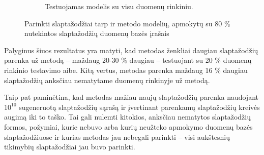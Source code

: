 \documentclass{VUMIFInfBakalaurinis}
\begin{document}
\begin{figure}[H]
\begin{subfigure}{.5\textwidth}
    \caption{Testuojamas modelis su visu  duomenų rinkiniu.}
    \label{plot:passgan-pcfg-linkedin-comparison}
  \end{subfigure}
  \caption{
    Parinkti slaptažodžiai tarp  ir  metodo 
    modelių, apmokytų su 80 \%  nutekintos slaptažodžių 
    duomenų bazės įrašais
  }
  \label{plot:passgan-pcfg-comparison}
\end{figure}%
Palyginus šiuos rezultatus yra matyti, kad  metodas ženkliai 
daugiau slaptažodžių parenka už  metodą -- maždaug 20-30 \% 
daugiau -- testuojant su 20 \%  duomenų rinkinio testavimo 
aibe. Kitą vertus,  metodas parenka maždaug 16 \% daugiau 
slaptažodžių anksčiau nematytame  duomenų rinkinyje už 
 metodą.

Taip pat paminėtina, kad  metodas mažiau naujų slaptažodžių 
parenka naudojant $10^{10}$ sugeneruotą slaptažodžių sąrašą ir įvertinant 
parenkamų slaptažodžių kreivės augimą iki to taško. Tai gali nulemti kitokios, 
anksčiau nematytos slaptažodžių formos, požymiai, kurie nebuvo arba kurių 
neužteko apmokymo duomenų bazės slaptažodžiuose ir kurias metodas jau nebegali 
parinkti -- visi aukštesnių tikimybių slaptažodžiai jau buvo parinkti.
\end{document}
